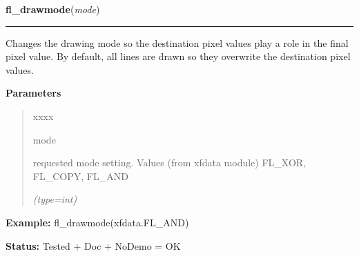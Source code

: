 \hspace{.8\funcindent}\begin{boxedminipage}{\funcwidth}

    \raggedright \textbf{fl\_drawmode}(\textit{mode})

    \vspace{-1.5ex}

    \rule{\textwidth}{0.5\fboxrule}
\setlength{\parskip}{2ex}
    Changes the drawing mode so the destination pixel values play a role in
    the final pixel value. By default, all lines are drawn so they 
    overwrite the destination pixel values.

\setlength{\parskip}{1ex}
      \textbf{Parameters}
      \vspace{-1ex}

      \begin{quote}
        \begin{Ventry}{xxxx}

          \item[mode]

          requested mode setting. Values (from xfdata module) FL\_XOR, 
          FL\_COPY, FL\_AND

            {\it (type=int)}

        \end{Ventry}

      \end{quote}

\textbf{Example:} fl\_drawmode(xfdata.FL\_AND)



\textbf{Status:} Tested + Doc + NoDemo = OK



    \end{boxedminipage}

    \label{xformslib:flxbasic:fl_get_linewidth}

    \vspace{0.5ex}

